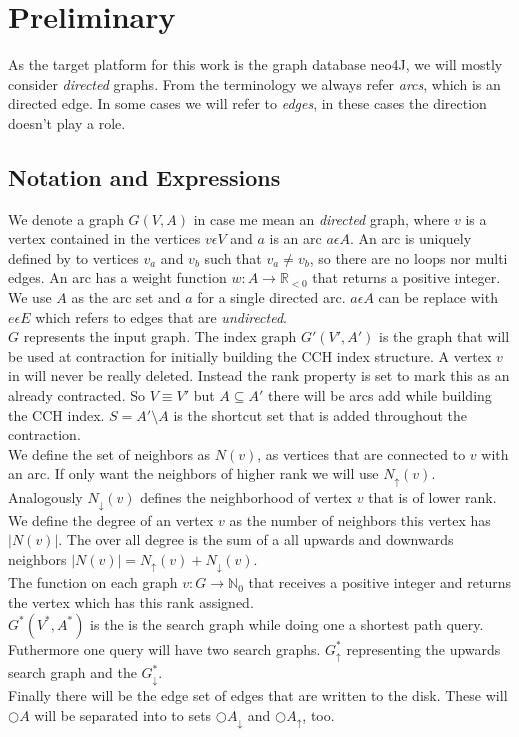 \chapter{Preliminary}

As the target platform for this work is the graph database neo4J, we will mostly consider \textit{directed} graphs.
From the terminology we always refer \textit{arcs}, which is an directed edge.
In some cases we will refer to \textit{edges}, in these cases the direction doesn't play a role.

\section{Notation and Expressions}
We denote a graph $G(V, A)$ in case me mean an \textit{directed} graph, where $v$ is a vertex contained in the vertices $v \epsilon  V$ and $a$ is an arc $a \epsilon A$.
An arc is uniquely defined by to vertices $v_a$ and $v_b$ such that $v_a \neq v_b$, so there are no loops nor multi edges.
An arc has a weight function $w: A \rightarrow \mathbb{R}_{<0} $ that returns a positive integer.
\\
We use $A$ as the arc set and $a$ for a single directed arc.
$a \epsilon A$ can be replace with $e \epsilon E$ which refers to edges that are \textit{undirected}. 
\\
$G$ represents the input graph.
The index graph $G'(V', A')$ is the graph that will be used at contraction for initially building the CCH index structure.
A vertex $v$ in will never be really deleted.
Instead the rank property is set to mark this as an already contracted.
So $V \equiv V'$ but $A \subseteq A'$ there will be arcs add while building the CCH index.
$S = A' \setminus A$ is the shortcut set that is added throughout the contraction.
\\
We define the set of neighbors as $N(v)$, as vertices that are connected to $v$ with an arc. 
If only want the neighbors of higher rank we will use $N_\uparrow(v)$.
Analogously $N_\downarrow(v)$ defines the neighborhood of vertex $v$ that is of lower rank.
\\
We define the degree of an vertex $v$ as the number of neighbors this vertex has $|N(v)|$. 
The over all degree is the sum of a all upwards and downwards neighbors $|N(v)| = N_\uparrow(v) + N_\downarrow(v)$.
\\
The function on each graph $v : G \rightarrow \mathbb{N}_0$ that receives a positive integer and returns the vertex which has this rank assigned.
\\
$G^*(V^*, A^*)$ is the is the search graph while doing one a shortest path query.
Futhermore one query will have two search graphs.
$G^*_\uparrow$ representing the upwards search graph and the $G^*_\downarrow$.
\\
Finally there will be the edge set of edges that are written to the disk.
These will $\bigcirc A$ will be separated into to sets $\bigcirc A_\downarrow$ and $\bigcirc A_\uparrow $, too.

